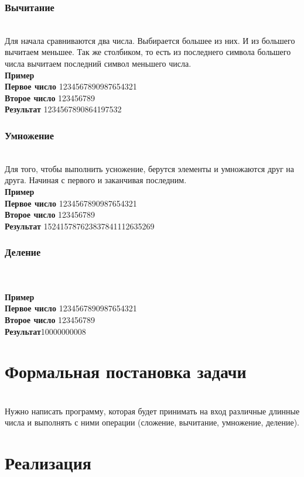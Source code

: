 \documentclass[a4paper]{article}
\begin{document}
\subsubsection{Вычитание}
\\Для начала сравниваются два числа. Выбирается большее из них. И из большего вычитаем меньшее. Так же столбиком, то есть из последнего символа большего числа вычитаем последний символ меньшего числа.
\\ \textbf{Пример}
\\ \textbf{Первое число} 1234567890987654321
\\ \textbf{Второе число} 123456789
\\ \textbf{Результат} 1234567890864197532

\subsubsection{Умножение}
\\Для того, чтобы выполнить усножение, берутся элементы и умножаются друг на друга. Начиная с первого и заканчивая последним.
\\ \textbf{Пример}
\\ \textbf{Первое число} 1234567890987654321
\\ \textbf{Второе число} 123456789
\\ \textbf{Результат} 152415787623837841112635269

\subsubsection{Деление}
\\
\\ \textbf{Пример}
\\ \textbf{Первое число} 1234567890987654321
\\ \textbf{Второе число} 123456789
\\ \textbf{Результат}10000000008
\newpage

\section{Формальная постановка задачи}
\\Нужно написать программу, которая будет принимать на вход различные длинные числа и выполнять с ними операции (сложение, вычитание, умножение, деление).
\newpage

\section{Реализация}
\end{document}
